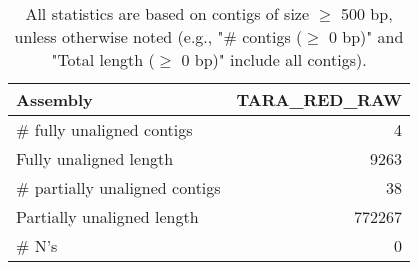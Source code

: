 \documentclass[12pt,a4paper]{article}
\begin{document}
\begin{table}[ht]
\begin{center}
\caption{All statistics are based on contigs of size $\geq$ 500 bp, unless otherwise noted (e.g., "\# contigs ($\geq$ 0 bp)" and "Total length ($\geq$ 0 bp)" include all contigs).}
\begin{tabular}{|l*{1}{|r}|}
\hline
Assembly & TARA\_RED\_RAW \\ \hline
\# fully unaligned contigs & 4 \\ \hline
Fully unaligned length & 9263 \\ \hline
\# partially unaligned contigs & 38 \\ \hline
Partially unaligned length & 772267 \\ \hline
\# N's & 0 \\ \hline
\end{tabular}
\end{center}
\end{table}
\end{document}
